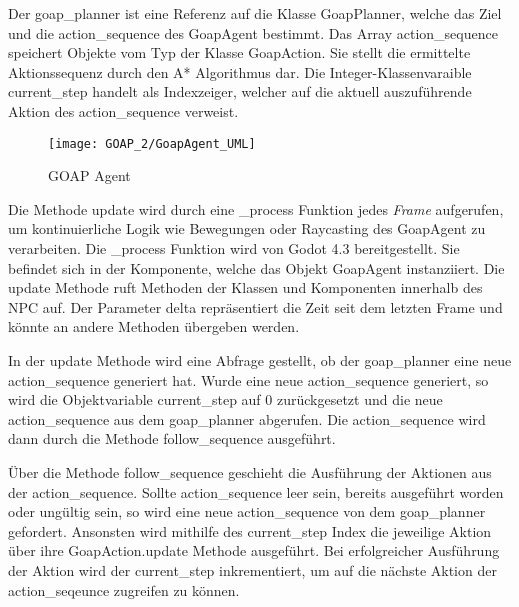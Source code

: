 Der goap\_planner ist eine Referenz auf die Klasse GoapPlanner, welche das Ziel und die action\_sequence des GoapAgent bestimmt. Das Array action\_sequence speichert Objekte vom Typ der Klasse GoapAction. Sie stellt die ermittelte Aktionssequenz durch den A* Algorithmus dar. Die Integer-Klassenvaraible current\_step handelt als Indexzeiger, welcher auf die aktuell auszuführende Aktion des action\_sequence verweist.

\begin{figure}[h]
  \centering
  \texttt{[image: GOAP\_2/GoapAgent\_UML]}
	\captionsetup{justification=justified, format=plain}
  \caption{GOAP Agent}
  \label{GOAP Agent}
\end{figure}

Die Methode update wird durch eine \_process Funktion jedes \textit{Frame} aufgerufen, um kontinuierliche Logik wie Bewegungen oder Raycasting des GoapAgent zu verarbeiten. Die \_process Funktion wird von Godot 4.3 bereitgestellt. Sie befindet sich in der Komponente, welche das Objekt GoapAgent instanziiert. Die update Methode ruft Methoden der Klassen und Komponenten innerhalb des NPC auf. Der Parameter delta repräsentiert die Zeit seit dem letzten Frame und könnte an andere Methoden übergeben werden.



In der update Methode wird eine Abfrage gestellt, ob der goap\_planner eine neue action\_sequence generiert hat. Wurde eine neue action\_sequence generiert, so wird die Objektvariable current\_step auf $0$ zurückgesetzt und die neue action\_sequence aus dem goap\_planner abgerufen. Die action\_sequence wird dann durch die Methode follow\_sequence ausgeführt.

Über die Methode follow\_sequence geschieht die Ausführung der Aktionen aus der action\_sequence. Sollte action\_sequence leer sein, bereits ausgeführt worden oder ungültig sein, so wird eine neue action\_sequence von dem goap\_planner gefordert. Ansonsten wird mithilfe des current\_step Index die jeweilige Aktion über ihre GoapAction.update Methode ausgeführt. Bei erfolgreicher Ausführung der Aktion wird der current\_step inkrementiert, um auf die nächste Aktion der action\_seqeunce zugreifen zu können.






